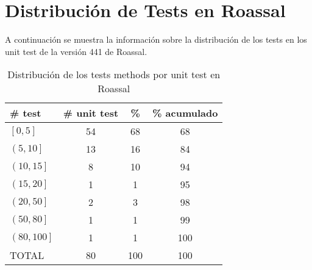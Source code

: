 \chapter{Distribución de Tests en Roassal}


\par A continuación se muestra la información sobre la distribución de los tests en los unit test de la versión 441 de Roassal.

\vspace*{3cm}
\begin{table}[H] 
    \centering 
    \begin{tabular}{|l|c|c|c|}
        \hline
        \textbf{\# test} & \textbf{\# unit test} & \textbf{\%} & \textbf{\% acumulado} \\ \hline\hline
        $\left[ 0,5 \right]$    & 54    &68 & 68 \\ \hline
        $\left( 5,10 \right]$   & 13    &16 & 84 \\ \hline
        $\left( 10,15 \right]$  & 8 &10 & 94 \\ \hline
        $\left( 15,20 \right]$  & 1 &1  & 95 \\ \hline
        $\left( 20,50 \right]$  & 2 &3  & 98 \\ \hline
        $\left( 50,80 \right]$  & 1 &1  & 99  \\\hline
        $\left( 80,100 \right]$ & 1 &1  & 100 \\ \hline \hline
        TOTAL   & 80    &100  & 100  \\ \hline
    \end{tabular}
    \caption{Distribución de los tests methods por unit test en Roassal}
\end{table} 

\clearpage

